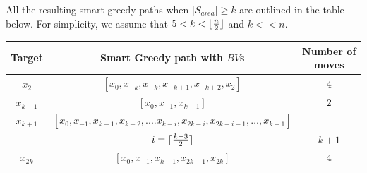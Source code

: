 \noindent All the resulting smart greedy paths when  $\left\vert{S_{area}}\right\vert \ge k$ are outlined in the table below. For simplicity, we assume that $5<k<\lfloor {n \over 2} \rfloor$  and $k<<n$. \\




\begin{center}
  \begin{tabular}{|c|c|c|}
 \hline
 Target & Smart Greedy path with $BV$s & Number of moves 
\\
 \hline
$x_2$ &$[x_0, x_{-k}, x_{-k}, x_{-k+1},x_{-k+2}, x_2]$ & $4$ \\

\hline
 $x_{k-1}$ & $[x_0, x_{-1}, x_{k-1}]$ & $2$\\

 \hline
 $x_{k+1}$ &  $[x_0, x_{-1}, x_{k-1}, x_{k-2}, .... x_{k-i}, x_{2k-i}, x_{2k-i-1}, \ldots, x_{k+1}]$ &\\
    &  $i = \lceil{{ k-3} \over 2}\rceil$  & $k+1$ \\  

 
 \hline
 $x_{2k}$ & $[x_0, x_{-1}, x_{k-1}, x_{2k-1},x_{2k}]$ & $4$ \\

\hline
\end{tabular} 

 \end{center}

